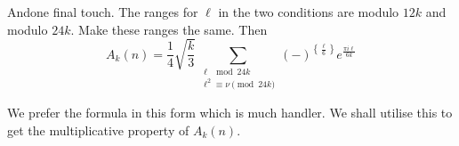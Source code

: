 And\pageoriginale one final touch. The ranges for $\ell$ in the two
conditions are modulo $12k$ and modulo $24k$. Make these ranges the
same. Then
$$
  A_k (n) = \frac{1}{4} \sqrt{\frac{k}{3}} \sum 
    _{\substack{\ell  \mod 24k\\ \ell^2 \equiv \nu \pmod{
        24 k}}}(-)^{\left\{ \frac{\ell}{6}\right\}} e^{\frac{\pi i \ell}{6k}} 
$$ 

We prefer the formula in this form which is much handler. We shall
utilise this to get the multiplicative property of  $A_k(n)$.
